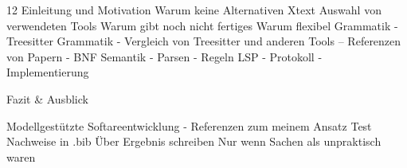 

\normalsize{12}
	Einleitung und Motivation
	Warum keine Alternativen Xtext
	Auswahl von verwendeten Tools
	Warum gibt noch nicht fertiges
	Warum flexibel
	Grammatik
	- Treesitter Grammatik
	- Vergleich von Treesitter und anderen Tools
	-- Referenzen von Papern
	- BNF
    Semantik
    - Parsen
    - Regeln
    LSP
    - Protokoll
    - Implementierung

    Fazit & Ausblick

    Modellgestützte Softareentwicklung
    - Referenzen zum meinem Ansatz
	Test
	Nachweise in .bib
	Über Ergebnis schreiben
	Nur wenn Sachen als unpraktisch waren
	

